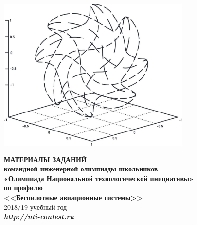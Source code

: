 \begin{titlepage}
    \begin{center}
        \includegraphics[width=9.71cm]{title}

        \vspace{1cm}
        \fontsize{15}{0.7cm}\textbf{МАТЕРИАЛЫ ЗАДАНИЙ}\\
        \vspace{0.2cm}
        \fontsize{15}{0.7cm}\textbf{командной инженерной олимпиады школьников}\\
        \vspace{0.2cm}
        \fontsize{15}{0.7cm}\textbf{«Олимпиада Национальной технологической инициативы»}\\
        \vspace{0.5cm}
        \fontsize{15}{0.7cm}\textbf{по профилю}\\
        \vspace{0.2cm}
        \fontsize{15}{0.7cm}\textbf{<<Беспилотные авиационные системы>>}\\
        \vspace{1.5cm}
        \fontsize{15}{0}2018/19 учебный год\\
        \vspace{9cm}
        \fontsize{15}{0}\textit{\textbf{http://nti-contest.ru}}
    \end{center}
\end{titlepage}